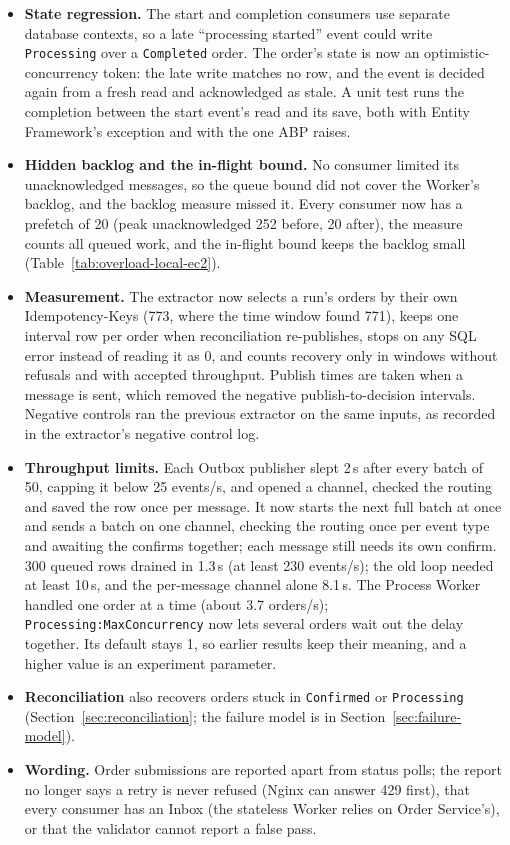 \documentclass[a4paper]{report}
\begin{document}
\begin{itemize}
  \item \textbf{State regression.} The start and completion consumers use
    separate database contexts, so a late ``processing started'' event could
    write \texttt{Processing} over a \texttt{Completed} order. The order's
    state is now an optimistic-concurrency token: the late write matches no
    row, and the event is decided again from a fresh read and acknowledged as
    stale. A unit test runs the completion between the start event's read
    and its save, both with Entity Framework's exception and with the one ABP
    raises.
  \item \textbf{Hidden backlog and the in-flight bound.} No consumer limited
    its unacknowledged messages, so the queue bound did not cover the
    Worker's backlog, and the backlog measure missed it. Every consumer now
    has a prefetch of 20 (peak unacknowledged 252 before, 20 after), the
    measure counts all queued work, and the in-flight bound keeps the backlog
    small (Table~\ref{tab:overload-local-ec2}).
  \item \textbf{Measurement.} The extractor now selects a run's orders by
    their own Idempotency-Keys (773, where the time window found 771), keeps
    one interval row per order when reconciliation re-publishes, stops on any
    SQL error instead of reading it as 0, and counts recovery only in windows
    without refusals and with accepted throughput. Publish times are taken
    when a message is sent, which removed the negative publish-to-decision
    intervals. Negative controls ran the previous extractor on the same
    inputs, as recorded in the extractor's negative control log.
  \item \textbf{Throughput limits.} Each Outbox publisher slept 2\,s after
    every batch of 50, capping it below 25 events/s, and opened a channel,
    checked the routing and saved the row once per message. It now starts
    the next full batch at once and sends a batch on one channel, checking
    the routing once per event type and awaiting the confirms together; each
    message still needs its own confirm. 300 queued rows drained in 1.3\,s
    (at least 230 events/s); the old loop needed at least 10\,s, and the
    per-message channel alone 8.1\,s. The Process Worker handled one order at
    a time (about 3.7 orders/s); \texttt{Processing:MaxConcurrency} now lets
    several orders wait out the delay together. Its default stays 1, so
    earlier results keep their meaning, and a higher value is an experiment
    parameter.
  \item \textbf{Reconciliation} also recovers orders stuck in
    \texttt{Confirmed} or \texttt{Processing}
    (Section~\ref{sec:reconciliation}; the failure model is in
    Section~\ref{sec:failure-model}).
  \item \textbf{Wording.} Order submissions are reported apart from status
    polls; the report no longer says a retry is never refused (Nginx can
    answer 429 first), that every consumer has an Inbox (the stateless
    Worker relies on Order Service's), or that the validator cannot report a
    false pass.
\end{itemize}
\end{document}
